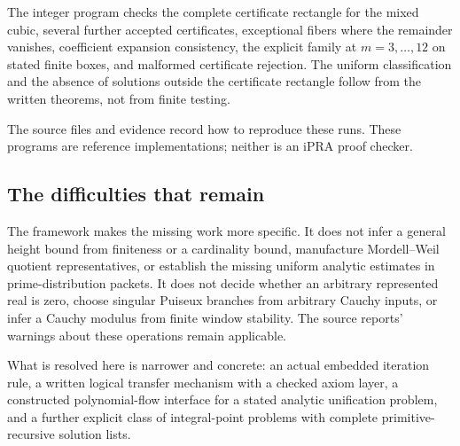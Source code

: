 The integer program checks the complete certificate rectangle for the
mixed cubic, several further accepted certificates, exceptional fibers
where the remainder vanishes, coefficient expansion consistency, the
explicit family at $m=3,\ldots,12$ on stated finite boxes, and malformed
certificate rejection. The uniform classification and the absence of
solutions outside the certificate rectangle follow from the written
theorems, not from finite testing.

The source files and evidence record how to reproduce these runs. These
programs are reference implementations; neither is an iPRA proof checker.

\subsection{The difficulties that remain}

The framework makes the missing work more specific. It does not infer a
general height bound from finiteness or a cardinality bound, manufacture
Mordell--Weil quotient representatives, or establish the missing uniform
analytic estimates in prime-distribution packets. It does not decide
whether an arbitrary represented real is zero, choose singular Puiseux
branches from arbitrary Cauchy inputs, or infer a Cauchy modulus from finite
window stability. The source reports' warnings about these operations
remain applicable.

What is resolved here is narrower and concrete: an actual embedded
iteration rule, a written logical transfer mechanism with a checked axiom
layer, a constructed polynomial-flow interface for a stated analytic
unification problem, and a further explicit class of integral-point
problems with complete primitive-recursive solution lists.
